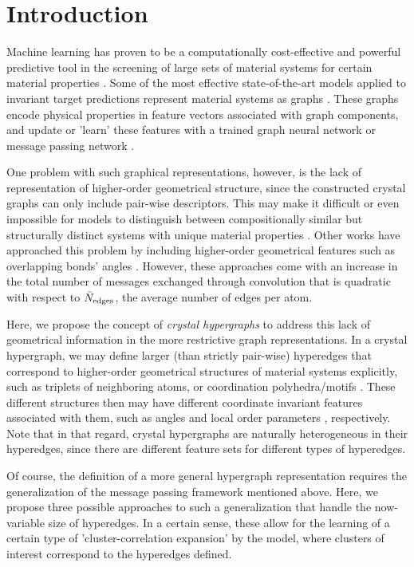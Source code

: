 \documentclass[twoside,twocolumn,9pt]{article}
\begin{document}
\section{Introduction}
Machine learning has proven to be a computationally cost-effective and powerful predictive tool in the screening of large sets of material systems for certain material properties \cite{mlcite1, mlreview1, mlreview2, mlreview3}. Some of the most effective state-of-the-art models applied to invariant target predictions represent material systems as graphs \cite{schnet, cgcnn, megnet, chemgnn, geocgcnn, icgcnn}. These graphs encode physical properties in feature vectors associated with graph components, and update or 'learn' these features with a trained graph neural network or message passing network \cite{mpnn}. 

One problem with such graphical representations, however, is the lack of representation of higher-order geometrical structure, since the constructed crystal graphs can only include pair-wise descriptors. This may make it difficult or even impossible for models to distinguish between compositionally similar but structurally distinct systems with unique material properties \cite{congn}. Other works have approached this problem by including higher-order geometrical features such as overlapping bonds' angles \cite{alignn,m3gnet,congn}. However, these approaches come with an increase in the total number of messages exchanged through convolution that is quadratic with respect to $\Bar{N}_{\text{edges}}$, the average number of edges per atom.

Here, we propose the concept of \textit{crystal hypergraphs} to address this lack of geometrical information in the more restrictive graph representations. In a crystal hypergraph, we may define larger (than strictly pair-wise) hyperedges that correspond to higher-order geometrical structures of material systems explicitly, such as triplets of neighboring atoms, or coordination polyhedra/motifs \cite{paulings_rules, coordpolyshapes, motifstats, motifexplore, clustermotifsanal, motife3nn}. These different structures then may have different coordinate invariant features associated with them, such as angles and local order parameters \cite{orderparam1, orderparam2, molorderparam}, respectively. Note that in that regard, crystal hypergraphs are naturally heterogeneous in their hyperedges, since there are different feature sets for different types of hyperedges.

Of course, the definition of a more general hypergraph representation requires the generalization of the message passing framework mentioned above. Here, we propose three possible approaches to such a generalization that handle the now-variable size of hyperedges. In a certain sense, these allow for the learning of a certain type of 'cluster-correlation expansion' \cite{clease, cce_crys, cce_gen} by the model, where clusters of interest correspond to the hyperedges defined.
\end{document}
